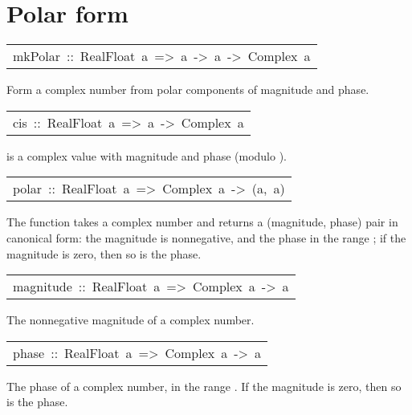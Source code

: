 \section{Polar form
}
\begin{haddockdesc}
\item[\begin{tabular}{@{}l}
mkPolar\ ::\ RealFloat\ a\ =>\ a\ ->\ a\ ->\ Complex\ a
\end{tabular}]\haddockbegindoc
Form a complex number from polar components of magnitude and phase.
\par

\end{haddockdesc}
\begin{haddockdesc}
\item[\begin{tabular}{@{}l}
cis\ ::\ RealFloat\ a\ =>\ a\ ->\ Complex\ a
\end{tabular}]\haddockbegindoc
{} is a complex value with magnitude 
 and phase  (modulo ).
\par

\end{haddockdesc}
\begin{haddockdesc}
\item[\begin{tabular}{@{}l}
polar\ ::\ RealFloat\ a\ =>\ Complex\ a\ ->\ (a,\ a)
\end{tabular}]\haddockbegindoc
The function  takes a complex number and
 returns a (magnitude, phase) pair in canonical form:
 the magnitude is nonnegative, and the phase in the range ;
 if the magnitude is zero, then so is the phase.
\par

\end{haddockdesc}
\begin{haddockdesc}
\item[\begin{tabular}{@{}l}
magnitude\ ::\ RealFloat\ a\ =>\ Complex\ a\ ->\ a
\end{tabular}]\haddockbegindoc
The nonnegative magnitude of a complex number.
\par

\end{haddockdesc}
\begin{haddockdesc}
\item[\begin{tabular}{@{}l}
phase\ ::\ RealFloat\ a\ =>\ Complex\ a\ ->\ a
\end{tabular}]\haddockbegindoc
The phase of a complex number, in the range .
 If the magnitude is zero, then so is the phase.
\par

\end{haddockdesc}
